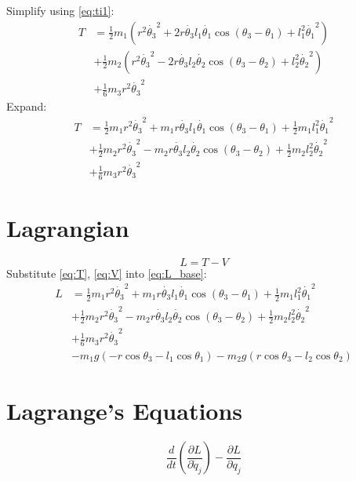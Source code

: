 \documentclass[titlepage]{article}
\numberwithin{equation}{section}
\begin{document}
Simplify using \ref{eq:ti1}:
\begin{align}
T &= \frac{1}{2} m_1 (r^2 \dot{\theta_3}^2 + 2 r \dot{\theta_3} l_1 \dot{\theta_1} \cos{(\theta_3 - \theta_1)} + l_1^2 \dot{\theta_1}^2) \nonumber \\
 & + \frac{1}{2} m_2 (r^2 \dot{\theta_3}^2 - 2 r \dot{\theta_3} l_2 \dot{\theta_2} \cos{(\theta_3 - \theta_2)} + l_2^2 \dot{\theta_2}^2) \nonumber \\
 &+ \frac{1}{6} m_3 r^2 \dot{\theta_3}^2
\end{align}
Expand:
\begin{align}
T &= \frac{1}{2} m_1 r^2 \dot{\theta_3}^2 + m_1 r \dot{\theta_3} l_1 \dot{\theta_1} \cos{(\theta_3 - \theta_1)} + \frac{1}{2} m_1 l_1^2 \dot{\theta_1}^2 \nonumber \\
 & + \frac{1}{2} m_2 r^2 \dot{\theta_3}^2 - m_2 r \dot{\theta_3} l_2 \dot{\theta_2} \cos{(\theta_3 - \theta_2)} + \frac{1}{2} m_2 l_2^2 \dot{\theta_2}^2 \nonumber \\
 &+ \frac{1}{6} m_3 r^2 \dot{\theta_3}^2 \label{eq:T}
\end{align}

\section{Lagrangian}
\begin{equation} \label{eq:L_base}
L = T - V
\end{equation}
Substitute \ref{eq:T}, \ref{eq:V} into \ref{eq:L_base}:
\begin{align}
L &= \frac{1}{2} m_1 r^2 \dot{\theta_3}^2 + m_1 r \dot{\theta_3} l_1 \dot{\theta_1} \cos{(\theta_3 - \theta_1)} + \frac{1}{2} m_1 l_1^2 \dot{\theta_1}^2 \nonumber \\
 & + \frac{1}{2} m_2 r^2 \dot{\theta_3}^2 - m_2 r \dot{\theta_3} l_2 \dot{\theta_2} \cos{(\theta_3 - \theta_2)} + \frac{1}{2} m_2 l_2^2 \dot{\theta_2}^2 \nonumber \\
 &+ \frac{1}{6} m_3 r^2 \dot{\theta_3}^2 \nonumber \\
 &- m_1 g (-r \cos \theta_3 - l_1 \cos \theta_1) - m_2 g (r \cos \theta_3 - l_2 \cos \theta_2)
\end{align}

\section{Lagrange's Equations}
\begin{equation} \label{eq:LE_base}
\frac{d}{dt} \left(\frac{\partial L}{\partial \dot{q}_j}\right) - \frac{\partial L}{\partial q_j}
\end{equation}
\end{document}
